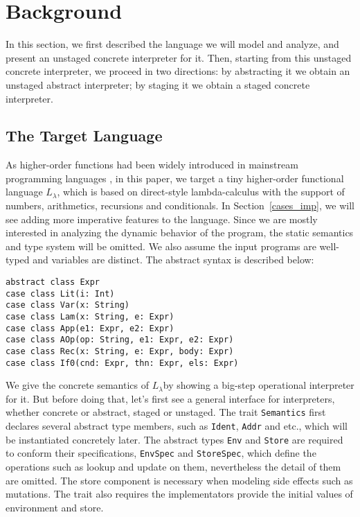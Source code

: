 \newcommand{\TLang}{$L_\lambda$}

\section{Background}

In this section, we first described the language we will model and analyze, and present an unstaged concrete 
interpreter for it. Then, starting from this unstaged concrete interpreter, we proceed in two directions:
by abstracting it we obtain an unstaged abstract interpreter; by staging it we obtain a staged concrete
interpreter.

\subsection{The Target Language} \label{bg_lang}

As higher-order functions had been widely introduced in mainstream programming languages , in this paper, 
we target a tiny higher-order functional language \TLang, which is based on direct-style lambda-calculus
with the support of numbers, arithmetics, recursions and conditionals.
In Section~\ref{cases_imp}, we will see adding more imperative features to the language.
Since we are mostly interested in analyzing the dynamic behavior of the program, the static semantics and
type system will be omitted. We also assume the input programs are well-typed and variables are distinct.
The abstract syntax is described below:

\begin{lstlisting}
abstract class Expr
case class Lit(i: Int)
case class Var(x: String)
case class Lam(x: String, e: Expr)
case class App(e1: Expr, e2: Expr)
case class AOp(op: String, e1: Expr, e2: Expr)
case class Rec(x: String, e: Expr, body: Expr)
case class If0(cnd: Expr, thn: Expr, els: Expr)
\end{lstlisting}

We give the concrete semantics of \TLang by showing a big-step operational interpreter for it.
But before doing that, let's first see a general interface for interpreters, whether concrete or abstract, 
staged or unstaged. The trait \texttt{Semantics} first declares several abstract type members, such as \texttt{Ident},
\texttt{Addr} and etc., which will be instantiated concretely later. The abstract types \texttt{Env} and \texttt{Store}
are required to conform their specifications, \texttt{EnvSpec} and \texttt{StoreSpec}, which define 
the operations such as lookup and update on them, nevertheless the detail of them are omitted.  
The store component is necessary when modeling side effects such as mutations. 
The trait also requires the implementators provide the initial values of environment and store.

